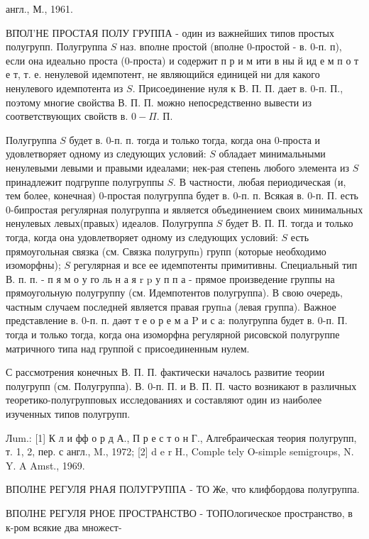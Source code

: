 \documentclass[10pt]{article}
\begin{document}
англ., М., 1961.



ВП̈ОЛ'НЕ ПРОСТАЯ ПОЛУ ГРУППА - один из важнейших типов простых полугрупп. Полугруппа $S$ наз. вполне простой (вполне 0-простой - в. 0-п. п), если она идеально проста (0-проста) и содержит п р и м ити в ны й ид е м п о т е т, т. е. ненулевой идемпотент, не являющийся единицей ни для какого ненулевого идемпотента из $S$. Присоединение нуля к В. П. П. дает в. 0-п. П., поэтому многие свойства В. П. П. можно непосредственно вывести из соответствующих свойств в. $0-\Pi$. П.



Полугруппа $S$ будет в. 0-п. п. тогда и только тогда, когда она 0-проста и удовлетворяет одному из следующих условий: $S$ обладает минимальными ненулевыми левыми и правыми идеалами; нек-рая степень любого элемента из $S$ принадлежит подгруппе полугруппы $S$. В частности, любая периодическая (и, тем более, конечная) 0-простая полугруппа будет в. 0-п. п. Всякая в. 0-п. П. есть 0-бипростая регулярная полугруппа и является объединением своих минимальных ненулевых левых(правых) идеалов. Полугруппа $S$ будет В. П. П. тогда и только тогда, когда она удовлетворяет одному из следующих условий: $S$ есть прямоугольная связка (см. Связка полугрупn) групп (которые необходимо изоморфны); $S$ регулярная и все ее идемпотенты примитивны. Специальный тип В. п. п. - п я м о у го ль н а я r p у п п а - прямое произведение группы на прямоугольную полугруппу (см. Идемпотентов полугруппа). В свою очередь, частным случаем последней является правая групnа (левая группа). Важное представление в. 0-п. п. даөт т е о р е м а $\mathrm{P}$ и с а: полугруппа будет в. 0-п. П. тогда и только тогда, когда она изоморфна регулярной рисовской полугруппе матричного типа над группой с присоединенным нулем.



С рассмотрения конечных В. П. П. фактически началось развитие теории полугрупп (см. Полугруппа). В. 0-п. П. и В. П. П. часто возникают в различных теоретико-полугрупповых исследованиях и составляют один из наиболее изученных типов полугрупп.



Лum.: [1] К л и фф о р д А., П р е с т о н Г., Алгебраическая теория полугрупп, т. 1, 2, пер. с англ., M., 1972; [2] d e r H., Comple tely O-simple semigroups, N. Y. A Amst., 1969.



ВПОЛНЕ РЕГУЛЯ РНАЯ ПОЛУГРУППА - ТО Же, что клифбордова полугруппа.



ВПОЛНЕ РЕГУЛЯ РНОЕ ПРОСТРАНСТВО - ТОПОлогическое пространство, в к-ром всякие два множест-
\end{document}
